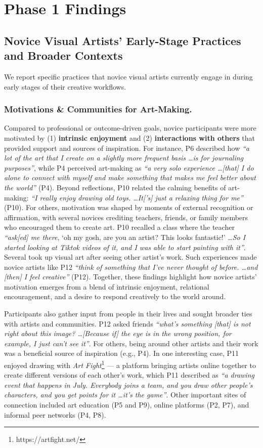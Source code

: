 \section{Phase 1 Findings} %


\subsection{Novice Visual Artists' Early-Stage Practices and Broader Contexts}
We report specific practices that novice visual artists currently engage in during early stages of their creative workflows.
\subsubsection{Motivations \& Communities for Art-Making.}
Compared to professional or outcome-driven goals, novice participants were more motivated by (1) \textbf{intrinsic enjoyment} and (2) \textbf{interactions with others} that provided support and sources of inspiration. For instance, P6 described how \textit{``a lot of the art that I create on a slightly more frequent basis \dots is for journaling purposes''}, while P4 perceived art-making as \textit{``a very solo experience \dots  [that] I do alone to connect with myself and make something that makes me feel better about the world''} (P4). Beyond reflections, P10 related the calming benefits of art-making: \textit{``I really enjoy drawing old toys. \dots It['s] just a relaxing thing for me''} (P10). For others, motivation was shaped by moments of external recognition or affirmation, with several novices crediting teachers, friends, or family members who encouraged them to create art. P10 recalled a class where the teacher
\textit{``ask[ed] me there}, `oh my gosh, are you an artist? This looks fantastic!' \dots \textit{So I started looking at Tiktok videos of it, and I was able to start painting with it''}. Several took up visual art after seeing other artist's work. Such experiences made novice artists like P12 \textit{``think of something that I've never thought of before. \dots and [then] I feel creative''} (P12). Together, these findings highlight how novice artists' motivation emerges from a blend of intrinsic enjoyment, relational encouragement, and a desire to respond creatively to the world around. 

Participants also gather input from people in their lives and sought broader ties with artists and communities. P12 asked friends \textit{``what's something [that] is not right about this image? \dots [Because if] the eye is in the wrong position, for example, I just can't see it''}. For others, being around other artists and their work was a beneficial source of inspiration (e.g., P4). In one interesting case, P11 enjoyed drawing with \textit{Art Fight}\footnote{https://artfight.net/} --- a platform bringing artists online together to create different versions of each other's work, which P11 described as \textit{``a drawing event that happens in July. Everybody joins a team, and you draw other people's characters, and you get points for it \dots it's the game''}. 
Other important sites of connection included art education (P5 and P9), online platforms (P2, P7), and informal peer networks (P4, P8). 

